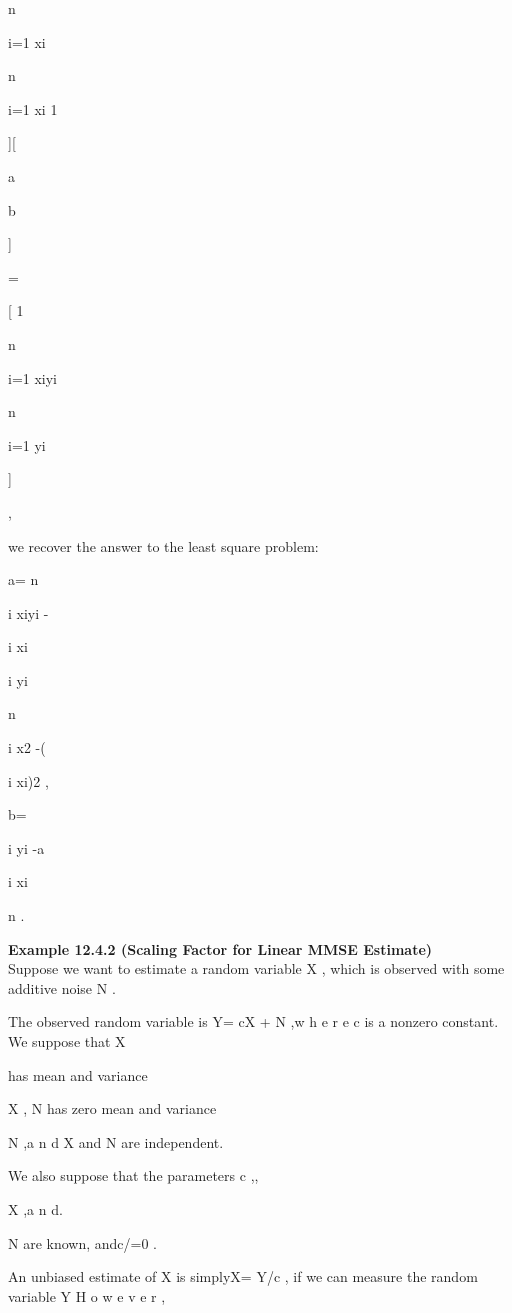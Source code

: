 n

\sumn

i=1 xi

n

\sumn

i=1 xi 1

][

a

b

]

=

[ 1

n

\sumn

i=1 xiyi

n

\sumn

i=1 yi

]

,

we recover the answer to the least square problem:

a= n \sum

i xiyi - \sum

i xi

\sum

i yi

n \sum

i x2 -( \sum

i xi)2 ,

b=

\sum

i yi -a \sum

i xi

n .

\textbf{Example 12.4.2 (Scaling Factor for Linear MMSE Estimate)} \\

Suppose we want to estimate a random variable X , which is observed with some additive noise N .

The observed random variable is Y= cX + N ,w h e r e c is a nonzero constant. We suppose that X

has mean \mu and variance 

X , N has zero mean and variance 

N ,a n d X and N are independent.

We also suppose that the parameters c ,\mu,

X ,a n d. 

N are known, andc/=0 .

An unbiased estimate of X is simplyX= Y/c , if we can measure the random variable Y H o w e v e r ,

